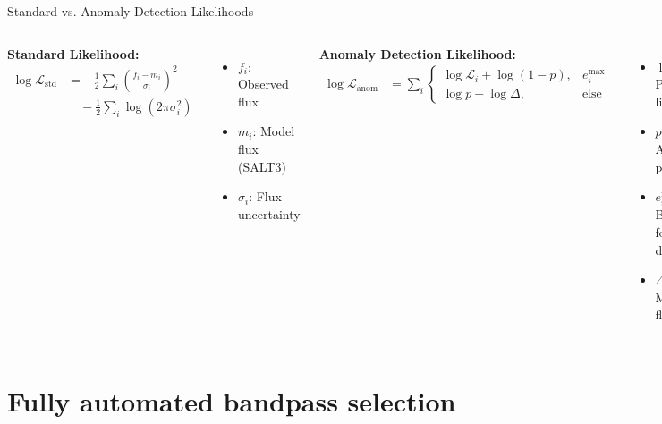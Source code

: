 \documentclass[aspectratio=169]{beamer}
\begin{document}
\begin{frame}{Standard vs. Anomaly Detection Likelihoods}
  \footnotesize
  \begin{columns}
    \textbf{Standard Likelihood:}
    \begin{align}
      \log \mathcal{L}_{\text{std}} &= -\frac{1}{2}\sum_i \left(\frac{f_i - m_i}{\sigma_i}\right)^2 \nonumber \\
      &\quad - \frac{1}{2}\sum_i \log(2\pi\sigma_i^2)
    \end{align}
    \begin{itemize}
      \item $f_i$: Observed flux
      \item $m_i$: Model flux (SALT3)
      \item $\sigma_i$: Flux uncertainty
    \end{itemize}
    
    \textbf{Anomaly Detection Likelihood:}
    \begin{align}
      \log \mathcal{L}_{\text{anom}} &= \sum_i \begin{cases}
        \log \mathcal{L}_i + \log(1-p), & e_i^{\max} \\
        \log p - \log \Delta, & \text{else}
      \end{cases}
    \end{align}
    \begin{itemize}
      \item $\log \mathcal{L}_i$: Point-wise likelihood
      \item $p$: Anomaly probability 
      \item $e_i^{\max}$: Boolean for normal data
      \item $\Delta$: Maximum flux range
    \end{itemize}
  \end{columns}
  
\end{frame}


\section{Fully automated bandpass selection}
\end{document}
